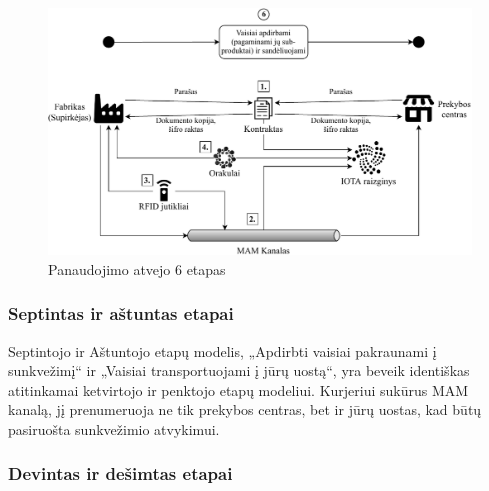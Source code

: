 \begin{figure}[H]
    \centering
    \includegraphics[scale=0.7]{images/iota-usecase-6}
    \caption{Panaudojimo atvejo 6 etapas}
\end{figure}




\subsubsection{Septintas ir aštuntas etapai}

Septintojo ir Aštuntojo etapų modelis, „Apdirbti vaisiai pakraunami į sunkvežimį“ ir „Vaisiai transportuojami į jūrų uostą“, yra beveik identiškas atitinkamai ketvirtojo ir penktojo etapų modeliui. Kurjeriui sukūrus MAM kanalą, jį prenumeruoja ne tik prekybos centras, bet ir jūrų uostas, kad būtų pasiruošta sunkvežimio atvykimui.




\subsubsection{Devintas ir dešimtas etapai}

